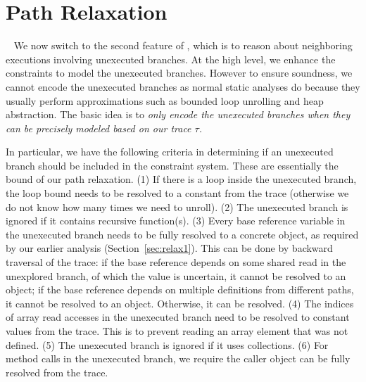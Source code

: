 \section{Path Relaxation}~\label{sec:relax2}
We now switch to the second feature of \tool, which is to reason about 
neighboring executions involving unexecuted branches.
At the high level, we enhance the constraints to model the unexecuted branches.
However to ensure soundness, we cannot encode the unexecuted branches as
normal static analyses do because they usually perform approximations such as bounded
loop unrolling and heap abstraction. The basic idea is to {\em only encode the
unexecuted branches when they can be precisely modeled based on our trace 
$\tau$.} 

In particular, we have the following criteria in determining if an 
unexecuted branch should be included in the constraint system. These are 
essentially the bound of our path relaxation.
(1) If there is a loop inside the unexecuted branch, the loop bound needs to
be resolved to a constant from the trace (otherwise we do not know how many
times we need to unroll). (2) The unexecuted branch
is ignored if it contains recursive function(s). (3) Every base reference 
variable in the unexecuted branch needs to be fully resolved to a concrete object,
as required by our earlier analysis (Section~\ref{sec:relax1}). This can be 
done by backward traversal of the trace:
if the base reference depends on some shared read in the unexplored 
branch, of which the value is uncertain, it cannot be 
resolved to an object; if the base reference depends on multiple definitions 
from different paths, it cannot be resolved to an object.
Otherwise, it can be resolved.
(4) The indices of array read accesses in the unexecuted branch 
need to be resolved to constant values from the trace. This is to
prevent reading an array element that was not defined. 
(5) The unexecuted branch is ignored if it uses collections. 
(6) For method calls in the unexecuted branch, we require the  caller object can be fully resolved from
the trace.
 
